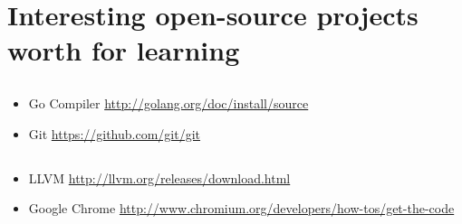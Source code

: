 ﻿\section{
{Interesting open-source projects worth for learning}}

\subsection{}

\begin{itemize}
\item
Go Compiler \url{http://golang.org/doc/install/source}

\item
Git \url{https://github.com/git/git}
\end{itemize}

\subsection{\CPP}

\begin{itemize}
\item
LLVM \url{http://llvm.org/releases/download.html}

\item
Google Chrome \url{http://www.chromium.org/developers/how-tos/get-the-code}
\end{itemize}

